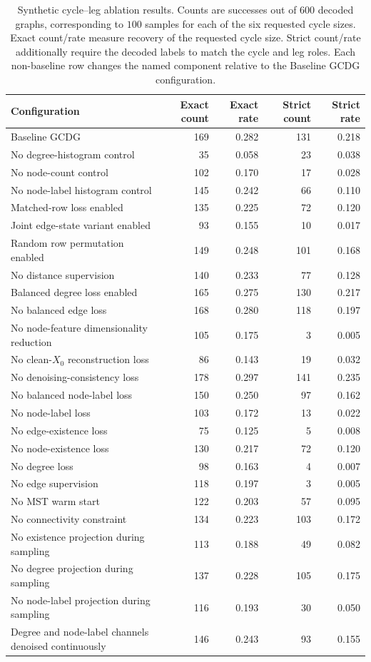 \begin{table}[p]
\centering
\footnotesize
\begin{tabularx}{\textwidth}{@{}Xrrrr@{}}
\toprule
Configuration & Exact count & Exact rate & Strict count & Strict rate \\
\midrule
Baseline GCDG & 169 & 0.282 & 131 & 0.218 \\
No degree-histogram control & 35 & 0.058 & 23 & 0.038 \\
No node-count control & 102 & 0.170 & 17 & 0.028 \\
No node-label histogram control & 145 & 0.242 & 66 & 0.110 \\
Matched-row loss enabled & 135 & 0.225 & 72 & 0.120 \\
Joint edge-state variant enabled & 93 & 0.155 & 10 & 0.017 \\
Random row permutation enabled & 149 & 0.248 & 101 & 0.168 \\
No distance supervision & 140 & 0.233 & 77 & 0.128 \\
Balanced degree loss enabled & 165 & 0.275 & 130 & 0.217 \\
No balanced edge loss & 168 & 0.280 & 118 & 0.197 \\
No node-feature dimensionality reduction & 105 & 0.175 & 3 & 0.005 \\
No clean-\(X_0\) reconstruction loss & 86 & 0.143 & 19 & 0.032 \\
No denoising-consistency loss & 178 & 0.297 & 141 & 0.235 \\
No balanced node-label loss & 150 & 0.250 & 97 & 0.162 \\
No node-label loss & 103 & 0.172 & 13 & 0.022 \\
No edge-existence loss & 75 & 0.125 & 5 & 0.008 \\
No node-existence loss & 130 & 0.217 & 72 & 0.120 \\
No degree loss & 98 & 0.163 & 4 & 0.007 \\
No edge supervision & 118 & 0.197 & 3 & 0.005 \\
No MST warm start & 122 & 0.203 & 57 & 0.095 \\
No connectivity constraint & 134 & 0.223 & 103 & 0.172 \\
No existence projection during sampling & 113 & 0.188 & 49 & 0.082 \\
No degree projection during sampling & 137 & 0.228 & 105 & 0.175 \\
No node-label projection during sampling & 116 & 0.193 & 30 & 0.050 \\
Degree and node-label channels denoised continuously & 146 & 0.243 & 93 & 0.155 \\
\bottomrule
\end{tabularx}
\caption{
Synthetic cycle--leg ablation results. Counts are successes out of \(600\)
decoded graphs, corresponding to \(100\) samples for each of the six requested
cycle sizes. Exact count/rate measure recovery of the requested cycle size.
Strict count/rate additionally require the decoded labels to match the cycle
and leg roles. Each non-baseline row changes the named component relative to the
Baseline GCDG configuration.
}
\label{tab:synthetic-cycle-leg-ablation-results}
\end{table}

